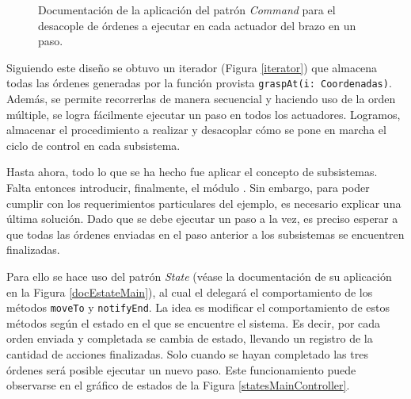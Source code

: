 \begin{figure}[h]
\caption{Documentación de la aplicación del patrón \textit{Command} para el desacople de órdenes a ejecutar en cada actuador del brazo en un paso.}
\label{docCommandSteps}
\end{figure}

Siguiendo este diseño se obtuvo un iterador (Figura \ref{iterator}) que almacena todas las órdenes generadas por la función provista \verb|graspAt(i: Coordenadas)|. Además, se permite recorrerlas de manera secuencial y haciendo uso de la orden múltiple, se logra fácilmente ejecutar un paso en todos los actuadores. Logramos, almacenar el procedimiento a realizar y desacoplar cómo se pone en marcha el ciclo de control en cada subsistema.



Hasta ahora, todo lo que se ha hecho fue aplicar el concepto de subsistemas. Falta entonces introducir, finalmente, el módulo \MainController. Sin embargo, para poder cumplir con los requerimientos particulares del ejemplo, es necesario explicar una última solución. Dado que se debe ejecutar un paso a la vez, es preciso esperar a que todas las órdenes enviadas en el paso anterior a los subsistemas se encuentren finalizadas.

Para ello se hace uso del patrón \textit{State} (véase la documentación de su aplicación en la Figura \ref{docEstateMain}), al cual el \MainController delegará el comportamiento de los métodos \verb|moveTo| y \verb|notifyEnd|. La idea es modificar el comportamiento de estos métodos según el estado en el que se encuentre el sistema. Es decir, por cada orden enviada y completada se cambia de estado, llevando un registro de la cantidad de acciones finalizadas. Solo cuando se hayan completado las tres órdenes será posible ejecutar un nuevo paso. Este funcionamiento puede observarse en el gráfico de estados de la Figura \ref{statesMainController}.

